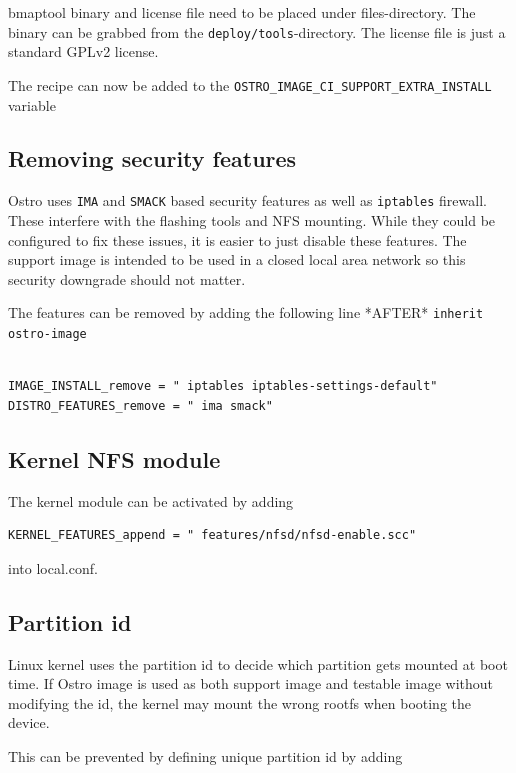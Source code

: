 \documentclass[a4paper,11pt]{article}
\newcommand{\cmd}[1]{\texttt{#1}}
\begin{document}
bmaptool binary and license file need to be placed under files-directory. The binary can be grabbed from the \cmd{deploy/tools}-directory. The license file is just a standard GPLv2 license.

The recipe can now be added to the \cmd{OSTRO\_IMAGE\_CI\_SUPPORT\_EXTRA\_INSTALL} variable


\subsection*{Removing security features}

Ostro uses \cmd{IMA} and \cmd{SMACK} based security features as well as \cmd{iptables} firewall. These interfere with the flashing tools and NFS mounting. While they could be configured to fix these issues, it is easier to just disable these features. The support image is intended to be used in a closed local area network so this security downgrade should not matter.

The features can be removed by adding the following line *AFTER* \cmd{inherit ostro-image}

\begin{lstlisting}

IMAGE_INSTALL_remove = " iptables iptables-settings-default"
DISTRO_FEATURES_remove = " ima smack"

\end{lstlisting}

\subsection*{Kernel NFS module}

The kernel module can be activated by adding

\begin{lstlisting}
KERNEL_FEATURES_append = " features/nfsd/nfsd-enable.scc"
\end{lstlisting}
into local.conf. 

\subsection*{Partition id}

Linux kernel uses the partition id to decide which partition gets mounted at boot time. If Ostro image is used as both support image and testable image without modifying the id, the kernel may mount the wrong rootfs when booting the device.

This can be prevented by defining unique partition id by adding
\end{document}
